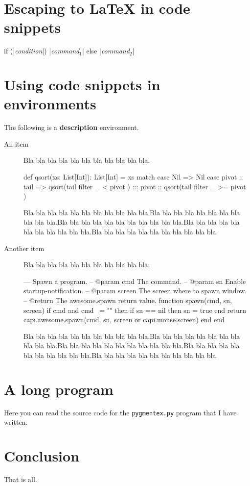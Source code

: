 \documentclass[10pt]{article}
\def\a{Bla bla bla bla bla bla bla bla bla bla bla.}
\def\b{\a\a\a\a\a}
\begin{document}

\section{Escaping to \LaTeX{} in code snippets}

\begin{pygmented}[lang=c,style=manni,escapeinside=||,
]
if (|\textit{condition}|)
  |\textit{command$_1$}|
else
  |\textit{command$_2$}|
\end{pygmented}


\section{Using code snippets in environments}

The following is a \textbf{description} environment.

\begin{description}
  \item[An item] \a
  \begin{pygmented}[lang=scala,backgroundcolor=yellow,
    ]
def qsort(xs: List[Int]): List[Int] =
  xs match {
    case Nil =>
      Nil
    case pivot :: tail =>
      qsort(tail filter { _ < pivot }) :::
        pivot :: qsort(tail filter { _ >= pivot })
  }
  \end{pygmented}
  \b
  
  \item[Another item] \a
  \begin{pygmented}[lang=lua,backgroundcolor=yellow]
--- Spawn a program.
-- @param cmd The command.
-- @param sn Enable startup-notification.
-- @param screen The screen where to spawn window.
-- @return The awesome.spawn return value.
function spawn(cmd, sn, screen)
    if cmd and cmd ~= "" then
        if sn == nil then sn = true end
        return capi.awesome.spawn(cmd, sn, screen or capi.mouse.screen)
    end
end
  \end{pygmented}
  \b
\end{description}

\section{A long program}

Here you can read the source code for the \texttt{pygmentex.py} program
that I have written.


\section{Conclusion}

That is all.
\end{document}
